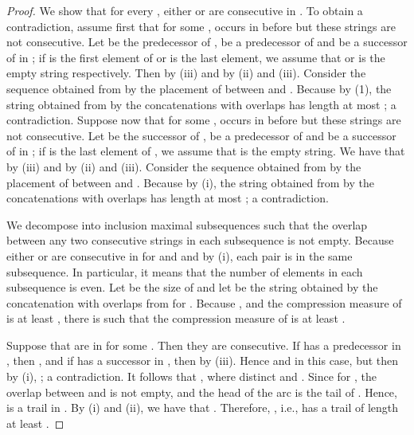 \documentclass[11pt]{article}
\begin{document}
\begin{proof}
We show that for every , either  or  are consecutive in . To obtain a contradiction, assume first that for some ,  occurs in  before  but these strings are not consecutive.  Let  be the predecessor of ,  be a predecessor of  and  be a successor of  in ; if  is the first element of  or  is the last element, we assume that  or  is the empty string respectively. 
Then  by (iii) and  by (ii) and (iii). Consider the sequence 
 obtained from  by the placement of  between  and . Because  by (1), the string  obtained from  by the concatenations with overlaps has length at  most ; a contradiction.  Suppose now that      
for some ,  occurs in  before  but these strings are not consecutive. Let   be the successor of ,  be a predecessor of  and  be a successor of  in ; if  is the  last element of , we assume that  is the empty string. 
We have that   by (iii) and  by (ii) and (iii). Consider the sequence 
 obtained from  by the placement of  between  and . Because  by (i), the string  obtained from  by the concatenations with overlaps has length at  most ; a contradiction. 

We decompose  into inclusion maximal subsequences  such that the overlap between any two consecutive strings in each subsequence is not empty.
Because  either  or  are consecutive in  for  and   and  by (i), each pair  is in the same subsequence. In particular, it means that the number of elements in each subsequence is even. Let  be the size of  and let  be the string obtained by the concatenation with overlaps from  for . Because ,  and the compression measure of  is at least , 
there is  such that the compression measure  of  is at least .

Suppose that  are in  for some . Then they are consecutive. If  has a predecessor  in , then , and if 
 has a successor  in , then  by (iii). Hence  and  in this case, but then by (i), ; a contradiction. It follows that , where distinct  and . 
Since for , the overlap between  and  is not empty,  and the head of the arc  is the tail of .
Hence,  is a  trail in . By (i) and (ii), we have that . Therefore, , i.e.,  has a  trail of length at least . 
\end{proof}







\end{document}
